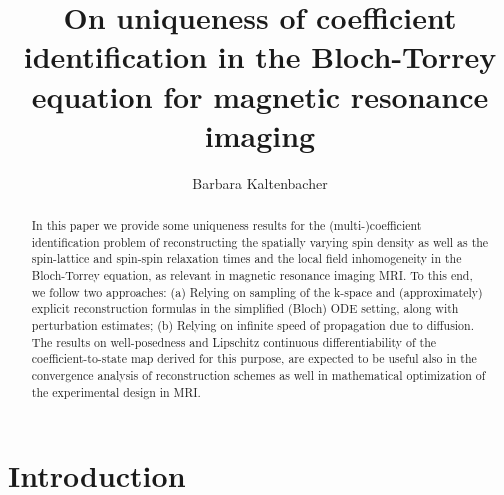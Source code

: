 \documentclass{ws-m3as}
\begin{document}

%
\catchline{}{}{}{}{}
%
\title{On uniqueness of coefficient identification in the Bloch-Torrey equation for magnetic resonance imaging}
\author{Barbara Kaltenbacher}
\address{Department of Mathematics, University of Klagenfurt, Universit\"atsstra\ss e 65-67, 9020 Klagenfurt, Austria\\
barbara.kaltenbacher@aau.at}

\maketitle

\begin{history}
\end{history}

\begin{abstract}
In this paper we provide some uniqueness results for the (multi-)coefficient identification problem of reconstructing the spatially varying spin density as well as the spin-lattice and spin-spin relaxation times and the local field inhomogeneity in the Bloch-Torrey equation, 
as relevant in magnetic resonance imaging MRI. To this end, we follow two approaches: (a) Relying on sampling of the k-space and (approximately) explicit reconstruction formulas in the simplified (Bloch) ODE setting, along with perturbation estimates; (b) Relying on infinite speed of propagation due to diffusion. The results on well-posedness and Lipschitz continuous differentiability of the coefficient-to-state map derived for this purpose, are expected to be useful also in the convergence analysis of reconstruction schemes as well in mathematical optimization of the experimental design in MRI.   
\end{abstract}



\section{Introduction}
\end{document}
